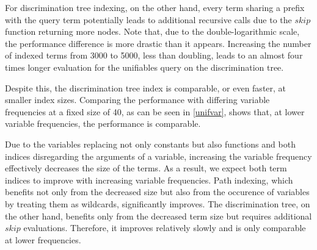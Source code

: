 For discrimination tree indexing, on the other hand, every term sharing a prefix with the query term potentially leads to additional recursive calls due to the $skip$ function returning more nodes. Note that, due to the double-logarithmic scale, the performance difference is more drastic than it appears. Increasing the number of indexed terms from 3000 to 5000, less than doubling, leads to an almost four times longer evaluation for the unifiables query on the discrimination tree.

Despite this, the discrimination tree index is comparable, or even faster, at smaller index sizes. Comparing the performance with differing variable frequencies at a fixed size of 40, as can be seen in \cref{unifvar}, shows that, at lower variable frequencies, the performance is comparable.

Due to the variables replacing not only constants but also functions and both indices disregarding the arguments of a variable, increasing the variable frequency effectively decreases the size of the terms. As a result, we expect both term indices to improve with increasing variable frequencies. Path indexing, which benefits not only from the decreased size but also from the occurence of variables by treating them as wildcards, significantly improves. The discrimination tree, on the other hand, benefits only from the decreased term size but requires additional $skip$ evaluations. Therefore, it improves relatively slowly and is only comparable at lower frequencies.

